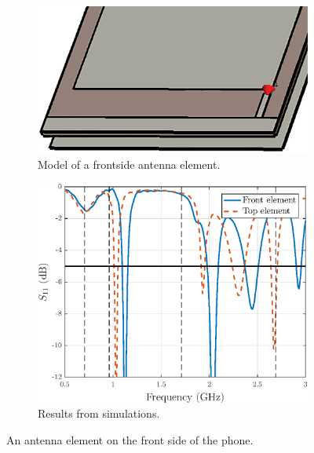 \begin{figure}[H]
    \vspace{-7pt}
    \centering
    \begin{subfigure}[b]{0.49\textwidth}
        \includegraphics[width=\textwidth]{img/front.eps}
        \caption{Model of a frontside antenna element.}
        \label{fig:front_model}
    \end{subfigure}
    \begin{subfigure}[b]{0.49\textwidth}
        \includegraphics[width=\textwidth]{img/front_res.eps}
        \caption{Results from simulations.}
        \label{fig:front_res}
    \end{subfigure}
    \caption{An antenna element on the front side of the phone.}
    \label{fig:front_elem}
\end{figure}

